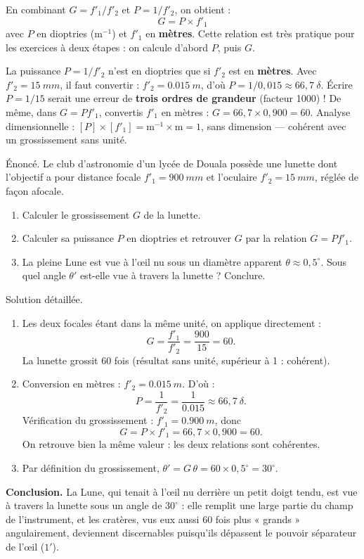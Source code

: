 \documentclass[11pt]{article}
\begin{document}
\begin{propriete}
En combinant $G = f'_1/f'_2$ et $P = 1/f'_2$, on obtient :
\[
\boxed{G = P \times f'_1}
\]
avec $P$ en dioptries ($\text{m}^{-1}$) et $f'_1$ en \textbf{mètres}. Cette relation est très pratique pour les exercices à deux étapes : on calcule d'abord $P$, puis $G$.
\end{propriete}

\begin{attention}
La puissance $P = 1/f'_2$ n'est en dioptries que si $f'_2$ est en \textbf{mètres}. Avec $f'_2 = \SI{15}{mm}$, il faut convertir : $f'_2 = \SI{0,015}{m}$, d'où $P = 1/0,015 \approx 66,7~\delta$. Écrire $P = 1/15$ serait une erreur de \textbf{trois ordres de grandeur} (facteur 1000) ! De même, dans $G = P f'_1$, convertis $f'_1$ en mètres : $G = 66,7 \times 0,900 = 60$. Analyse dimensionnelle : $[P]\times[f'_1] = \text{m}^{-1}\times\text{m} = 1$, sans dimension — cohérent avec un grossissement sans unité.
\end{attention}

\begin{exoresolu}
Énoncé. Le club d'astronomie d'un lycée de Douala possède une lunette dont l'objectif a pour distance focale $f'_1 = \SI{900}{mm}$ et l'oculaire $f'_2 = \SI{15}{mm}$, réglée de façon afocale.
\begin{enumerate}
\item Calculer le grossissement $G$ de la lunette.
\item Calculer sa puissance $P$ en dioptries et retrouver $G$ par la relation $G = Pf'_1$.
\item La pleine Lune est vue à l'œil nu sous un diamètre apparent $\theta \approx 0,5^{\circ}$. Sous quel angle $\theta'$ est-elle vue à travers la lunette ? Conclure.
\end{enumerate}
\tcblower
Solution détaillée.
\begin{enumerate}
\item Les deux focales étant dans la même unité, on applique directement :
\[
G = \dfrac{f'_1}{f'_2} = \dfrac{900}{15} = 60.
\]
La lunette grossit 60 fois (résultat sans unité, supérieur à 1 : cohérent).
\item Conversion en mètres : $f'_2 = \SI{0,015}{m}$. D'où :
\[
P = \dfrac{1}{f'_2} = \dfrac{1}{\num{0,015}} \approx 66,7~\delta.
\]
Vérification du grossissement : $f'_1 = \SI{0,900}{m}$, donc
\[
G = P \times f'_1 = 66,7 \times 0,900 = 60.
\]
On retrouve bien la même valeur : les deux relations sont cohérentes.
\item Par définition du grossissement, $\theta' = G\,\theta = 60 \times 0,5^{\circ} = 30^{\circ}$.
\end{enumerate}
\textbf{Conclusion.} La Lune, qui tenait à l'œil nu derrière un petit doigt tendu, est vue à travers la lunette sous un angle de $30^{\circ}$ : elle remplit une large partie du champ de l'instrument, et les cratères, vus eux aussi 60 fois plus « grands » angulairement, deviennent discernables puisqu'ils dépassent le pouvoir séparateur de l'œil ($1'$).
\end{exoresolu}
\end{document}

